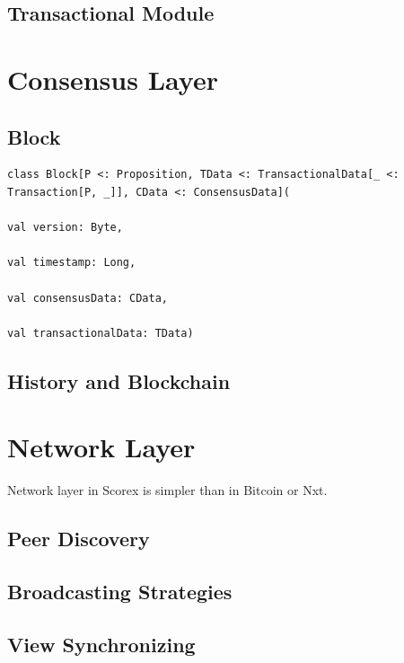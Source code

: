 \documentclass[]{report}   %
\begin{document}
\subsection{Transactional Module}



\section{Consensus Layer}

\subsection{Block}

\begin{lstlisting}
class Block[P <: Proposition, TData <: TransactionalData[_ <: Transaction[P, _]], CData <: ConsensusData](
                                                                                      val version: Byte,
                                                                                      val timestamp: Long,
                                                                                      val consensusData: CData,
                                                                                      val transactionalData: TData)
\end{lstlisting}

\subsection{History and Blockchain}

\section{Network Layer}

Network layer in Scorex is simpler than in Bitcoin or Nxt. 

\subsection{Peer Discovery}

\subsection{Broadcasting Strategies}

\subsection{View Synchronizing}
\end{document}
